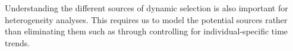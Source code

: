 \documentclass[12pt, a4paper]{article}
\begin{document}
Understanding the different sources of dynamic selection is also important for heterogeneity analyses. This requires us to model the potential sources rather than eliminating them such as through controlling for individual-specific time trends. 
%
%
%
%
%
%
%
%
\end{document}
